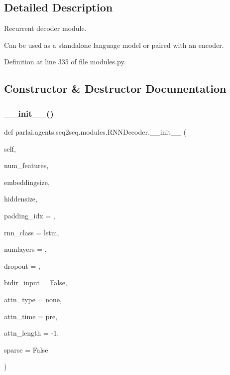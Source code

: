 \subsection{Detailed Description}
\begin{DoxyVerb}Recurrent decoder module.

Can be used as a standalone language model or paired with an encoder.
\end{DoxyVerb}
 

Definition at line 335 of file modules.\+py.



\subsection{Constructor \& Destructor Documentation}
\mbox{\label{classparlai_1_1agents_1_1seq2seq_1_1modules_1_1RNNDecoder_ac115797a89d673f99c26d1ed9fba6d30}} 
\subsubsection{\texorpdfstring{\+\_\+\+\_\+init\+\_\+\+\_\+()}{\_\_init\_\_()}}
{\footnotesize\ttfamily def parlai.\+agents.\+seq2seq.\+modules.\+R\+N\+N\+Decoder.\+\_\+\+\_\+init\+\_\+\+\_\+ (\begin{DoxyParamCaption}\item[{}]{self,  }\item[{}]{num\+\_\+features,  }\item[{}]{embeddingsize,  }\item[{}]{hiddensize,  }\item[{}]{padding\+\_\+idx = {},  }\item[{}]{rnn\+\_\+class = {\ttfamily \textquotesingle{}lstm\textquotesingle{}},  }\item[{}]{numlayers = {},  }\item[{}]{dropout = {},  }\item[{}]{bidir\+\_\+input = {\ttfamily False},  }\item[{}]{attn\+\_\+type = {\ttfamily \textquotesingle{}none\textquotesingle{}},  }\item[{}]{attn\+\_\+time = {\ttfamily \textquotesingle{}pre\textquotesingle{}},  }\item[{}]{attn\+\_\+length = {\ttfamily -\/1},  }\item[{}]{sparse = {\ttfamily False} }\end{DoxyParamCaption})}

